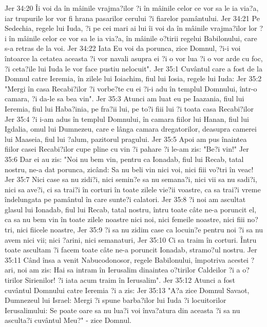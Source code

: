 Jer 34:20  Îi voi da în mâinile vrajma?ilor ?i în mâinile celor ce vor sa le ia via?a, iar trupurile lor vor fi hrana pasarilor cerului ?i fiarelor pamântului.
Jer 34:21  Pe Sedechia, regele lui Iuda, ?i pe cei mari ai lui îi voi da în mâinile vrajma?ilor lor ?i în mâinile celor ce vor sa le ia via?a, în mâinile o?tirii regelui Babilonului, care s-a retras de la voi.
Jer 34:22  Iata Eu voi da porunca, zice Domnul, ?i-i voi întoarce la cetatea aceasta ?i vor navali asupra ei ?i o vor lua ?i o vor arde cu foc, ?i ceta?ile lui Iuda le vor face pustiu nelocuit".
Jer 35:1  Cuvântul care a fost de la Domnul catre Ieremia, în zilele lui Ioiachim, fiul lui Iosia, regele lui Iuda:
Jer 35:2  "Mergi în casa Recabi?ilor ?i vorbe?te cu ei ?i-i adu în templul Domnului, într-o camara, ?i da-le sa bea vin".
Jer 35:3  Atunci am luat eu pe Iaazania, fiul lui Ieremia, fiul lui Haba?inia, pe fra?ii lui, pe to?i fiii lui ?i toata casa Recabi?ilor
Jer 35:4  ?i i-am adus în templul Domnului, în camara fiilor lui Hanan, fiul lui Igdalia, omul lui Dumnezeu, care e lânga camara dregatorilor, deasupra camerei lui Maaseia, fiul lui ?alum, pazitorul pragului.
Jer 35:5  Apoi am pus înaintea fiilor casei Recabi?ilor cupe pline cu vin ?i pahare ?i le-am zis: "Be?i vin!"
Jer 35:6  Dar ei au zis: "Noi nu bem vin, pentru ca Ionadab, fiul lui Recab, tatal nostru, ne-a dat porunca, zicând: Sa nu beli vin nici voi, nici fiii vo?tri în veac!
Jer 35:7  Nici case sa nu zidi?i, nici semin?e sa nu semana?i, nici vii sa nu sadi?i, nici sa ave?i, ci sa trai?i în corturi în toate zilele vie?ii voastre, ca sa trai?i vreme îndelungata pe pamântul în care sunte?i calatori.
Jer 35:8  ?i noi am ascultat glasul lui Ionadab, fiul lui Recab, tatal nostru, întru toate câte ne-a poruncit el, ca sa nu bem vin în toate zilele noastre nici noi, nici femeile noastre, nici fiii no?tri, nici fiicele noastre,
Jer 35:9  ?i sa nu zidim case ca locuin?e pentru noi ?i sa nu avem nici vii; nici ?arini, nici semanaturi,
Jer 35:10  Ci sa traim în corturi. Întru toate ascultam ?i facem toate câte ne-a poruncit Ionadab, stramo?ul nostru.
Jer 35:11  Când însa a venit Nabucodonosor, regele Babilonului, împotriva acestei ?ari, noi am zis: Hai sa intram în Ierusalim dinaintea o?tirilor Caldeilor ?i a o?tirilor Sirienilor! ?i iata acum traim în Ierusalim".
Jer 35:12  Atunci a fost cuvântul Domnului catre Ieremia ?i a zis:
Jer 35:13  "A?a zice Domnul Savaot, Dumnezeul lui Israel: Mergi ?i spune barba?ilor lui Iuda ?i locuitorilor Ierusalimului: Se poate oare sa nu lua?i voi înva?atura din aceasta ?i sa nu asculta?i cuvântul Meu?" - zice Domnul.
